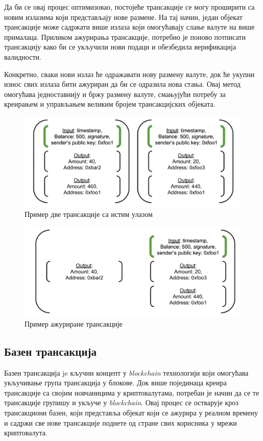 \documentclass[12pt, a4paper]{article}
\begin{document}
Да би се овај процес оптимизовао, постојеће трансакције се могу проширити са новим излазима који представљају нове размене. На тај начин, један објекат трансакције може садржати више излаза који омогућавају слање валуте на више прималаца. Приликом ажурирања трансакције, потребно је поново потписати трансакцију како би се укључили нови подаци и обезбедила верификација валидности.

Конкретно, сваки нови излаз ће одражавати нову размену валуте, док ће укупни износ свих излаза бити ажуриран да би се одразила нова стања. Овај метод омогућава једноставнију и бржу размену валуте, смањујући потребу за креирањем и управљањем великим бројем трансакцијских објеката.


\begin{figure}[h]
    \centering
    \includegraphics[width=1\linewidth]{slike/transaction-updates-1.png}
    \caption{Пример две трансакције са истим улазом}
    \label{fig:transaction-updates-before}
\end{figure}

\begin{figure}[h]
    \centering
    \includegraphics[width=1\linewidth]{slike/transaction-updates-2.png}
    \caption{Пример ажуриране трансакције}
    \label{fig:transaction-updates-now}
\end{figure}


\subsection{Базен трансакција}
Базен трансакција je кључни концепт у \textit{blockchain} технологији који омогућава укључивање група трансакција у блокове. Док више појединаца креира трансакције са својим новчаницима у криптовалутама, потребан је начин да се те трансакције групишу и укључе у \textit{blockchain}. Овај процес се остварује кроз трансакциони базен, који представља објекат који се ажурира у реалном времену и садржи све нове трансакције поднете од стране свих корисника у мрежи криптовалута.
\end{document}
